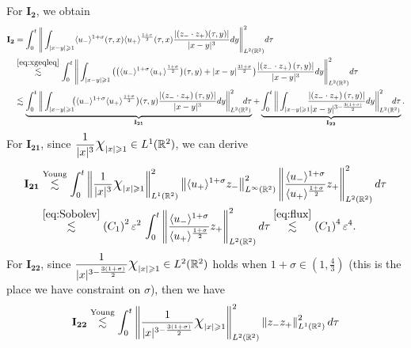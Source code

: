 \documentclass[10pt,reqno]{amsart}
\numberwithin{equation}{section}
\begin{document}
\begin{appendix}
For $\mathbf{I_2}$, we obtain
\begin{align*}
	\mathbf{I_2}
	&=\int_{0}^{t}\Bigg\|\int_{|x-y|\geqslant 1}\langle u_{-}\rangle^{{1+\sigma}}(\tau,x)\langle u_{+}\rangle^{\frac{{1+\sigma}}{2}}(\tau,x)\frac{\left|(z_{-}\cdot z_{+})(\tau,y)\right|}{|x-y|^3}dy\Bigg\|_{L^2(\mathbb{R}^2)}^2d\tau\\
	&\stackrel{\eqref{eq:xgeqleq}}{\lesssim} \int_{0}^{t}\Bigg\|\int_{|x-y|\geqslant 1}\big(\big(\langle u_{-}\rangle^{{1+\sigma}}\langle u_{+}\rangle^{\frac{{1+\sigma}}{2}}\big)(\tau,y)+|x-y|^{\frac{3{1+\sigma}}{2}}\big)\frac{\left|\left(z_{-}\cdot z_{+}\right)(\tau,y)\right|}{|x-y|^3}dy\Bigg\|_{L^2(\mathbb{R}^2)}^2d\tau\\
	&\lesssim
	\underbrace{\int_{0}^{t}\bigg\|\int_{|x-y|\geqslant 1}\!\!\!\big(\langle u_{-}\rangle^{{1+\sigma}}\langle u_{+}\rangle^{\frac{{1+\sigma}}{2}}\big)(\tau,y)\frac{\left|\left(z_{-}\cdot z_{+}\right)(\tau,y)\right|}{|x-y|^3}dy\bigg\|_{L^2(\mathbb{R}^2)}^2\!\!\!\!\!\!d\tau}_{\mathbf{I_{21}}} +\underbrace{\int_{0}^{t}\bigg\|\int_{|x-y|\geqslant 1}\!\!\!\frac{\left|\left(z_{-}\cdot z_{+}\right)(\tau,y)\right|}{|x-y|^{3-\frac{3(1+\sigma)}{2}}}dy\bigg\|_{L^2(\mathbb{R}^2)}^2\!\!\!\!\!\!d\tau}_{\mathbf{I_{22}}}.
\end{align*}
For $\mathbf{I_{21}}$, since $\dfrac{1}{|x|^3}\text{\Large$\chi$}_{|x|\geqslant 1}\in L^1(\mathbb{R}^2)$, we can derive
\begin{align*}
	\mathbf{I_{21}}&
	\stackrel{\text{Young}}{\lesssim}
	\int_{0}^{t}\left\|\frac{1}{|x|^3}\text{\Large$\chi$}_{|x|\geqslant 1}\right\|_{L^1(\mathbb{R}^2)}^2 \left\|\langle u_{+}\rangle^{{1+\sigma}}z_{-}\right\|_{L^\infty(\mathbb{R}^2)}^2\left\|\frac{\langle u_{-}\rangle^{{1+\sigma}}}{\langle u_{+}\rangle^{\frac{{1+\sigma}}{2}}}z_{+}\right\|_{L^2(\mathbb{R}^2)}^2d\tau \\
	&\stackrel{\eqref{eq:Sobolev}}{\lesssim}\left(C_1\right)^2\varepsilon^2\,\int_{0}^{t}\left\|\frac{\langle u_{-}\rangle^{{1+\sigma}}}{\langle u_{+}\rangle^{\frac{{1+\sigma}}{2}}}z_{+}\right\|_{L^2(\mathbb{R}^2)}^2d\tau
	\stackrel{\eqref{eq:flux}}{\lesssim} \left(C_1\right)^4\varepsilon^4.
\end{align*}
For $\mathbf{I_{22}}$, since $\dfrac{1}{|x|^{3-\frac{3(1+\sigma)}{2}}}\text{\Large$\chi$}_{|x|\geqslant 1}\in L^2(\mathbb{R}^2)$ holds when ${1+\sigma}\in(1,\frac{4}{3})$ (this is the place we have constraint on $\sigma$), then we have
\begin{align*}
	\mathbf{I_{22}}&
	\stackrel{\text{Young}}{\lesssim}
	\int_{0}^{t}\Bigg\|\frac{1}{|x|^{3-\frac{3(1+\sigma)}{2}}}\text{\Large$\chi$}_{|x|\geqslant 1}\Bigg\|_{L^2(\mathbb{R}^2)}^2\left\|z_{-}z_{+}\right\|_{L^1(\mathbb{R}^2)}^2d\tau\\

\end{align*}
\end{appendix}
\end{document}
